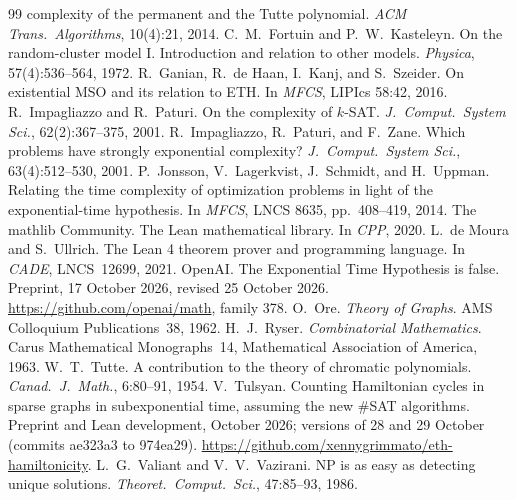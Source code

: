 \documentclass[11pt]{article}
\theoremstyle{remark}
\begin{document}
\begin{thebibliography}{99}
  complexity of the permanent and the Tutte polynomial. \emph{ACM Trans.\ Algorithms}, 10(4):21,
  2014.
 C.~M.~Fortuin and P.~W.~Kasteleyn. On the random-cluster model I. Introduction and
  relation to other models. \emph{Physica}, 57(4):536--564, 1972.
 R.~Ganian, R.~de Haan, I.~Kanj, and S.~Szeider. On existential MSO and its
  relation to ETH. In \emph{MFCS}, LIPIcs 58:42, 2016.
 R.~Impagliazzo and R.~Paturi. On the complexity of $k$-SAT. \emph{J.\ Comput.\
  System Sci.}, 62(2):367--375, 2001.
 R.~Impagliazzo, R.~Paturi, and F.~Zane. Which problems have strongly exponential
  complexity? \emph{J.\ Comput.\ System Sci.}, 63(4):512--530, 2001.
\bibitem{JLSU14} P.~Jonsson, V.~Lagerkvist, J.~Schmidt, and H.~Uppman. Relating the time
  complexity of optimization problems in light of the exponential-time hypothesis. In
  \emph{MFCS}, LNCS 8635, pp.~408--419, 2014.
 The mathlib Community. The Lean mathematical library. In \emph{CPP}, 2020.
\bibitem{lean4} L.~de Moura and S.~Ullrich. The Lean 4 theorem prover and programming language. In
  \emph{CADE}, LNCS~12699, 2021.
 OpenAI. The Exponential Time Hypothesis is false. Preprint, 17 October 2026,
  revised 25 October 2026. \url{https://github.com/openai/math}, family 378.
\bibitem{Ore62} O.~Ore. \emph{Theory of Graphs}. AMS Colloquium Publications~38, 1962.
\bibitem{Ryser63} H.~J.~Ryser. \emph{Combinatorial Mathematics}. Carus Mathematical
  Monographs~14, Mathematical Association of America, 1963.
 W.~T.~Tutte. A contribution to the theory of chromatic polynomials.
  \emph{Canad.\ J.\ Math.}, 6:80--91, 1954.
 V.~Tulsyan. Counting Hamiltonian cycles in sparse graphs in subexponential time,
  assuming the new \#SAT algorithms. Preprint and Lean development, October 2026; versions of
  28 and 29 October (commits ae323a3 to 974ea29). \url{https://github.com/xennygrimmato/eth-hamiltonicity}.
\bibitem{VV86} L.~G.~Valiant and V.~V.~Vazirani. NP is as easy as detecting unique solutions.
  \emph{Theoret.\ Comput.\ Sci.}, 47:85--93, 1986.
\end{thebibliography}
\end{document}
